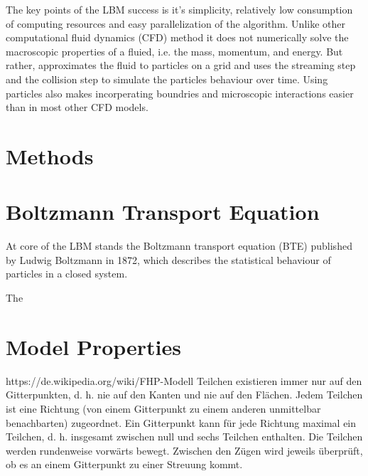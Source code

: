 \documentclass[a4paper,11pt]{report}
\begin{document}
The key points of the LBM success is it's simplicity, relatively low consumption of computing resources and easy parallelization of the algorithm.
Unlike other computational fluid dynamics (CFD) method it does not numerically solve the macroscopic properties of a fluied, i.e. the mass, momentum, and energy.
But rather, approximates the fluid to particles on a grid and uses the streaming step and the collision step to simulate the particles behaviour over time.
Using particles also makes incorperating boundries and microscopic interactions easier than in most other CFD models.

\section{Methods}


\section{Boltzmann Transport Equation}
At core of the LBM stands the Boltzmann transport equation (BTE) published by Ludwig Boltzmann in 1872, which describes the statistical behaviour of particles in a closed system.


The


\section{Model Properties}
https://de.wikipedia.org/wiki/FHP-Modell
Teilchen existieren immer nur auf den Gitterpunkten, d. h. nie auf den Kanten und nie auf den Flächen.
Jedem Teilchen ist eine Richtung (von einem Gitterpunkt zu einem anderen unmittelbar benachbarten) zugeordnet.
Ein Gitterpunkt kann für jede Richtung maximal ein Teilchen, d. h. insgesamt zwischen null und sechs Teilchen enthalten.
Die Teilchen werden rundenweise vorwärts bewegt. Zwischen den Zügen wird jeweils überprüft, ob es an einem Gitterpunkt zu einer Streuung kommt.





% 
\end{document}
